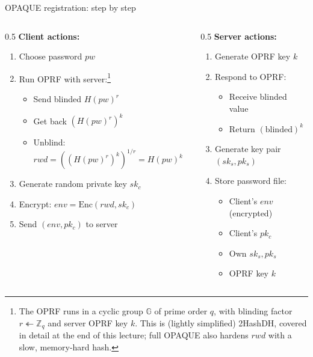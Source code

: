 \ifdefined\PRESENTATION\else\PassOptionsToClass{handout}{beamer}\fi\documentclass[aspectratio=169, lualatex]{beamer}
\begin{document}
\begin{frame}{OPAQUE registration: step by step}
	\begin{columns}[c]
		\begin{column}{0.5\textwidth}
			\textbf{Client actions:}
			\begin{enumerate}
				\item Choose password $pw$
				\item Run OPRF with server:\footnote{The OPRF runs in a cyclic group $\mathbb{G}$ of prime order $q$, with blinding factor $r \twoheadleftarrow \mathbb{Z}_q$ and server OPRF key $k$. This is (lightly simplified) 2HashDH, covered in detail at the end of this lecture; full OPAQUE also hardens $rwd$ with a slow, memory-hard hash.}
				      \begin{itemize}
					      \item Send blinded $H(pw)^r$
					      \item Get back $(H(pw)^r)^k$
					      \item Unblind: $rwd = ((H(pw)^r)^k)^{1/r} = H(pw)^k$
				      \end{itemize}
				\item Generate random private key $sk_c$
				\item Encrypt: $env = \text{Enc}(rwd, sk_c)$
				\item Send $(env, pk_c)$ to server
			\end{enumerate}
		\end{column}
		\begin{column}{0.5\textwidth}
			\textbf{Server actions:}
			\begin{enumerate}
				\item Generate OPRF key $k$
				\item Respond to OPRF:
				      \begin{itemize}
					      \item Receive blinded value
					      \item Return $(\text{blinded})^k$
				      \end{itemize}
				\item Generate key pair $(sk_s, pk_s)$
				\item Store password file:
				      \begin{itemize}
					      \item Client's $env$ (encrypted)
					      \item Client's $pk_c$
					      \item Own $sk_s, pk_s$
					      \item OPRF key $k$
				      \end{itemize}
			\end{enumerate}
		\end{column}
	\end{columns}
\end{frame}
\end{document}
